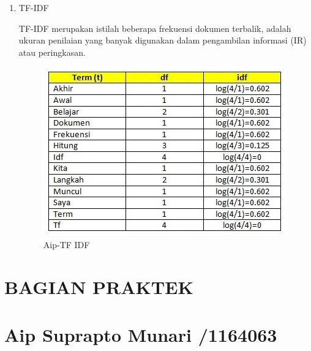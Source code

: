 \begin{enumerate}
\item TF-IDF
	\par TF-IDF merupakan istilah beberapa frekuensi dokumen terbalik, adalah ukuran penilaian yang banyak digunakan dalam pengambilan informasi (IR) atau peringkasan. 
	\begin{figure}[ht]
		\centering
		\includegraphics[scale=0.5]{figures/AIP/b5.PNG}
		\caption{Aip-TF IDF}
		\label{contoh}
	\end{figure}
\end{enumerate}

\section{BAGIAN PRAKTEK}
\section{Aip Suprapto Munari /1164063}

